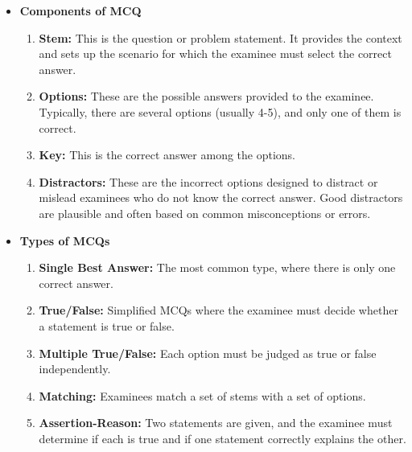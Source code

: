 \begin{itemize}

\item \textbf{Components of MCQ}

\begin{enumerate}

\item \textbf{Stem:} This is the question or problem statement. It provides the context and sets up the scenario for which the examinee must select the correct answer.

\item \textbf{Options:} These are the possible answers provided to the examinee. Typically, there are several options (usually 4-5), and only one of them is correct.

\item \textbf{Key:} This is the correct answer among the options.

\item \textbf{Distractors:} These are the incorrect options designed to distract or mislead examinees who do not know the correct answer. Good distractors are plausible and often based on common misconceptions or errors.

\end{enumerate}

\item \textbf{Types of MCQs}

\begin{enumerate}

\item \textbf{Single Best Answer:} The most common type, where there is only one correct answer.

\item \textbf{True/False:} Simplified MCQs where the examinee must decide whether a statement is true or false.

\item \textbf{Multiple True/False:} Each option must be judged as true or false independently.

\item \textbf{Matching:} Examinees match a set of stems with a set of options.

\item \textbf{Assertion-Reason:} Two statements are given, and the examinee must determine if each is true and if one statement correctly explains the other.

\end{enumerate}

\end{itemize}

